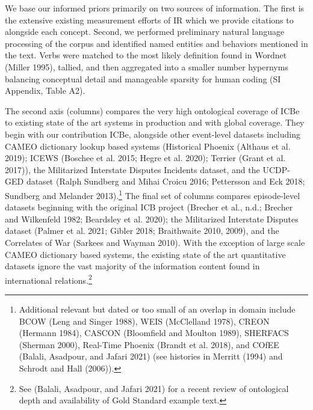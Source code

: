 \documentclass{article}
\renewcommand{\arraystretch}{0.8}
\begin{document}
We base our informed priors primarily on two sources of information. The
first is the extensive existing measurement efforts of IR which we
provide citations to alongside each concept. Second, we performed
preliminary natural language processing of the corpus and identified
named entities and behaviors mentioned in the text. Verbs were matched
to the most likely definition found in Wordnet (Miller 1995), tallied,
and then aggregated into a smaller number hypernyms balancing conceptual
detail and manageable sparsity for human coding (SI Appendix, Table A2).

The second axis (columns) compares the very high ontological coverage of
ICBe to existing state of the art systems in production and with global
coverage. They begin with our contribution ICBe, alongside other
event-level datasets including CAMEO dictionary lookup based systems
(Historical Phoenix (Althaus et al. 2019); ICEWS (Boschee et al. 2015;
Hegre et al. 2020); Terrier (Grant et al. 2017)), the Militarized
Interstate Disputes Incidents dataset, and the UCDP-GED dataset (Ralph
Sundberg and Mihai Croicu 2016; Pettersson and Eck 2018; Sundberg and
Melander 2013).\footnote{Additional relevant but dated or too small of
  an overlap in domain include BCOW (Leng and Singer 1988), WEIS
  (McClelland 1978), CREON (Hermann 1984), CASCON (Bloomfield and
  Moulton 1989), SHERFACS (Sherman 2000), Real-Time Phoenix (Brandt et
  al. 2018), and COfEE (Balali, Asadpour, and Jafari 2021) (see
  histories in Merritt (1994) and Schrodt and Hall (2006)).} The final
set of columns compares episode-level datasets beginning with the
original ICB project (Brecher et al., n.d.; Brecher and Wilkenfeld 1982;
Beardsley et al. 2020); the Militarized Interstate Disputes dataset
(Palmer et al. 2021; Gibler 2018; Braithwaite 2010, 2009), and the
Correlates of War (Sarkees and Wayman 2010). With the exception of large
scale CAMEO dictionary based systems, the existing state of the art
quantitative datasets ignore the vast majority of the information
content found in international relations.\footnote{See (Balali,
  Asadpour, and Jafari 2021) for a recent review of ontological depth
  and availability of Gold Standard example text.}

\clearpage

\providecommand{\docline}[3]{\noalign{\global\setlength{\arrayrulewidth}{#1}}\arrayrulecolor[HTML]{#2}\cline{#3}}

\setlength{\tabcolsep}{2pt}

\renewcommand*{\arraystretch}{0.75}
\end{document}
